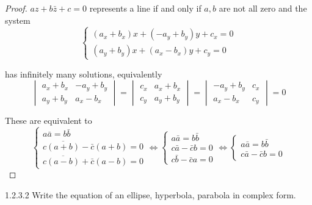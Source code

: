 \begin{proof}
	\( az + b\bar{z} + c = 0 \) represents a line if and only if \( a, b \) are not all zero and the system
	\[
		\begin{cases}
			(a_{x} + b_{x})x + (-a_{y} + b_{y})y + c_{x} = 0 \\
			(a_{y} + b_{y})x + (a_{x} - b_{x})y + c_{y} = 0
		\end{cases}
	\]

	has infinitely many solutions, equivalently
	\[
		\begin{vmatrix}
			a_{x} + b_{x} & -a_{y} + b_{y} \\
			a_{y} + b_{y} & a_{x} - b_{x}
		\end{vmatrix}
		=
		\begin{vmatrix}
			c_{x} & a_{x} + b_{x} \\
			c_{y} & a_{y} + b_{y}
		\end{vmatrix}
		=
		\begin{vmatrix}
			-a_{y} + b_{y} & c_{x} \\
			a_{x} - b_{x}  & c_{y}
		\end{vmatrix}
		= 0
	\]

	These are equivalent to
	\[
		\begin{cases}
			a\bar{a} = b\bar{b}                      \\
			c\overline{(a + b)} - \bar{c}(a + b) = 0 \\
			c\overline{(a - b)} + \bar{c}(a - b) = 0
		\end{cases}
		\iff
		\begin{cases}
			a\bar{a} = b\bar{b}     \\
			c\bar{a} - \bar{c}b = 0 \\
			c\bar{b} - \bar{c}a = 0
		\end{cases}
		\iff
		\begin{cases}
			a\bar{a} = b\bar{b} \\
			c\bar{a} - \bar{c}b = 0
		\end{cases}
	\]
\end{proof}

\begin{problem}{1.2.3.2}
Write the equation of an ellipse, hyperbola, parabola in complex form.
\end{problem}

